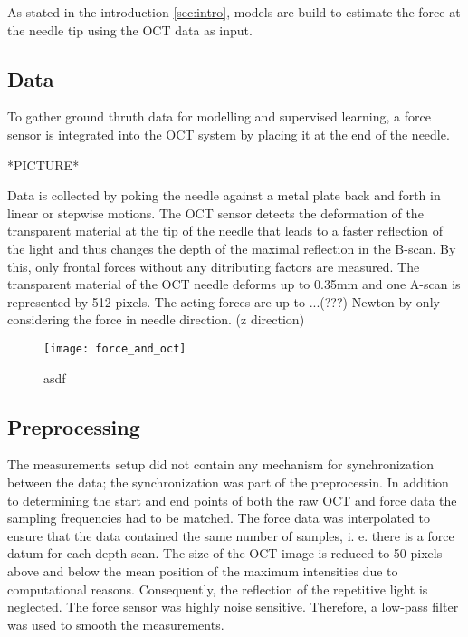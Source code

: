 

As stated in the introduction \ref{sec:intro}, models are build to estimate the force at the needle tip 
using the OCT data as input.

\subsection{Data}
To gather ground thruth data for modelling and supervised learning, a force sensor is 
integrated into the OCT system by placing it at the end of the needle.

*PICTURE*

Data is collected by poking the needle against a metal plate back and forth in linear or stepwise motions.
The OCT sensor detects the deformation of the transparent material at the tip of the needle that leads to a faster reflection of the light and thus
changes the depth of the maximal reflection in the B-scan.
By this, only frontal forces without any ditributing factors are measured.
The transparent material of the OCT needle deforms up to 0.35mm and one A-scan is represented by 512 pixels.
The acting forces are up to ...(???) Newton by only considering the force in needle direction. (z direction)

\begin{figure}
    \centering
    \texttt{[image: force\_and\_oct]}
    \caption{asdf}
    \label{fig:force_and_oct}
\end{figure}

\subsection{Preprocessing}

The measurements setup did not contain any mechanism for synchronization between the data; the synchronization was part of the preprocessin.
In addition to determining the start and end points of both the raw OCT and force data the sampling frequencies had to be matched.
The force data was interpolated to ensure that the data contained the same number of samples, i. e. there is a force datum for each depth scan.
The size of the OCT image is reduced to 50 pixels above and below the mean position of the maximum intensities due to
computational reasons. Consequently, the reflection of the repetitive light is neglected.
The force sensor was highly noise sensitive.
Therefore, a low-pass filter was used to smooth the measurements.

